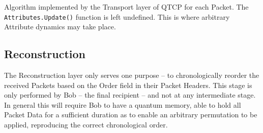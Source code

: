 \documentclass[aps,rmp,twocolumn,amsmath,amssymb,nofootinbib,superscriptaddress]{revtex4}
\begin{document}
\begin{table}[!htb]
\caption{Algorithm implemented by the {\sc Transport} layer of QTCP for each {\sc Packet}. The {\tt Attributes.Update()} function is left undefined. This is where arbitrary {\sc Attribute} dynamics may take place.} \label{tab:transport_alg}
\end{table}

%
%

\subsection{Reconstruction}

The {\sc Reconstruction} layer only serves one purpose -- to chronologically reorder the received {\sc Packets} based on the {\sc Order} field in their {\sc Packet Headers}. This stage is only performed by Bob -- the final recipient -- and not at any intermediate stage. In general this will require Bob to have a quantum memory, able to hold all {\sc Packet Data} for a sufficient duration as to enable an arbitrary permutation to be applied, reproducing the correct chronological order.
\end{document}
